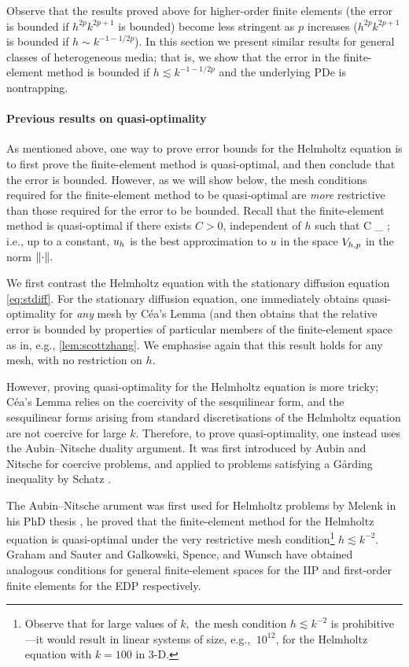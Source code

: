 Observe that the results proved above for higher-order finite elements (the error is bounded if $h^{2p}k^{2p+1}$ is bounded) become less stringent as $p$ increases ($h^{2p}k^{2p+1}$ is bounded if $h \sim k^{-1-1/2p}$). In this section we present similar results for general classes of heterogeneous media; that is, we show that the error in the finite-element method is bounded if $h \lesssim k^{-1-1/2p}$ and the underlying PDe is nontrapping.

\paragraph{Previous results on quasi-optimality} As mentioned above, one way to prove error bounds for the Helmholtz equation is to first prove the finite-element method is quasi-optimal, and then conclude that the error is bounded. However, as we will show below, the mesh conditions required for the finite-element method to be quasi-optimal are \emph{more} restrictive than those required for the error to be bounded. Recall that the finite-element method is quasi-optimal if there exists $C>0$, independent of $h$ such that
\beqs
{} \leq C \inf_{\vh \in \Vhp} ;
\eeqs
i.e., up to a constant, $u_{h}$ is the best approximation to $u$ in the space $V_{h,p}$ in the norm $\N{\cdot}.$

We first contrast the Helmholtz equation with the stationary diffusion equation \eqref{eq:stdiff}. For the stationary diffusion equation, one immediately obtains quasi-optimality for \emph{any} mesh by C\'ea's Lemma (and then obtains that the relative error is bounded by properties of particular members of the finite-element space as in, e.g., \cref{lem:scottzhang}. We emphasise again that this result holds for any mesh, with no restriction on $h.$

However, proving quasi-optimality for the Helmholtz equation is more tricky; C\'ea's Lemma relies on the coercivity of the sesquilinear form, and the sesquilinear forms arising from standard discretisations of the Helmholtz equation are not coercive for large $k$. Therefore, to prove quasi-optimality, one instead uses the Aubin--Nitsche duality argument. It was first introduced by Aubin \cite{Au:67} and Nitsche \cite{Ni:68} for coercive problems, and applied to problems satisfying a G\r{a}rding inequality by Schatz \cite{Sc:74}.

The Aubin--Nitsche arument was first used for Helmholtz problems by Melenk in his PhD thesis \cite[Proposition 8.2.7]{Me:95}, he proved that the finite-element method for the Helmholtz equation is quasi-optimal under the very restrictive mesh condition\footnote{Observe that for large values of $k,$ the mesh condition $h \lesssim k^{-2}$ is prohibitive---it would result in linear systems of size, e.g., $~10^{12}$, for the Helmholtz equation with $k=100$ in 3-D.} $h \lesssim k^{-2}.$ Graham and Sauter \cite[Remark 4.4 b.]{GrSa:18} and Galkowski, Spence, and Wunsch \cite[Theorem 3]{GaSpWu:18} have obtained analogous conditions for general finite-element spaces for the IIP \cite{GrSa:18} and first-order finite elements for the EDP \cite{GaSpWu:18} respectively.

